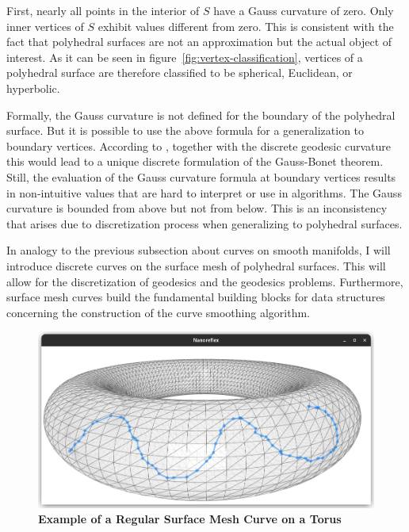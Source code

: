 \documentclass{stdlocal}
\begin{document}
  \noindent
  First, nearly all points in the interior of $S$ have a Gauss curvature of zero.
  Only inner vertices of $S$ exhibit values different from zero.
  This is consistent with the fact that polyhedral surfaces are not an approximation but the actual object of interest.
  As it can be seen in figure~\ref{fig:vertex-classification}, vertices of a polyhedral surface are therefore classified to be spherical, Euclidean, or hyperbolic.

  Formally, the Gauss curvature is not defined for the boundary of the polyhedral surface.
  But it is possible to use the above formula for a generalization to boundary vertices.
  According to \textcite{polthier2006}, together with the discrete geodesic curvature this would lead to a unique discrete formulation of the Gauss-Bonet theorem.
  Still, the evaluation of the Gauss curvature formula at boundary vertices results in non-intuitive values that are hard to interpret or use in algorithms.
  The Gauss curvature is bounded from above but not from below.
  This is an inconsistency that arises due to discretization process when generalizing to polyhedral surfaces.

  In analogy to the previous subsection about curves on smooth manifolds, I will introduce discrete curves on the surface mesh of polyhedral surfaces.
  This will allow for the discretization of geodesics and the geodesics problems.
  Furthermore, surface mesh curves build the fundamental building blocks for data structures concerning the construction of the curve smoothing algorithm.

  \begin{figure}
    \centering
    \includegraphics[width=0.8\linewidth,trim={15px 20 25 50},clip]{images/surface-mesh-curve-torus.png}
    \caption[Example of a Regular Surface Mesh Curve on a Torus]{%
      \textbf{Example of a Regular Surface Mesh Curve on a Torus}\\
    }
    \label{fig:surface-mesh-curve-example}
  \end{figure}
\end{document}
